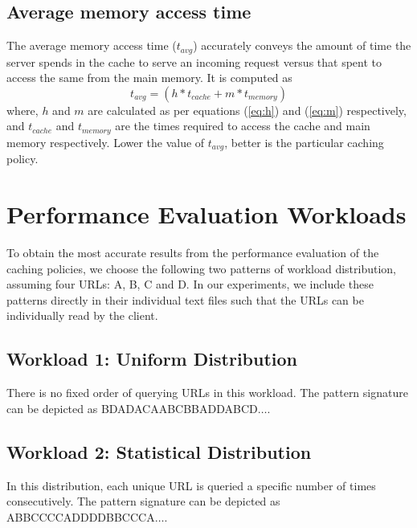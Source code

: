 \documentclass[11pt,pdftex,twocolumn]{article}
\begin{document}
\subsection{Average memory access time}
The average memory access time ($t_{avg}$) accurately conveys the amount of time the server spends in the cache to serve an incoming request versus that spent to access the same from the main memory. It is computed as
\begin{equation}
t_{avg} = \left(h * t_{cache} + m * t_{memory}\right)
\end{equation}
where,
$h$ and $m$ are calculated as per equations (\ref{eq:h}) and (\ref{eq:m}) respectively, and $t_{cache}$ and $t_{memory}$ are the times required to access the cache and main memory respectively. Lower the value of $t_{avg}$, better is the particular caching policy.

\section{Performance Evaluation Workloads}
\label{sec:perfWork}
To obtain the most accurate results from the performance evaluation of the caching policies, we choose the following two patterns of workload distribution, assuming four URLs: A, B, C and D. In our experiments, we include these patterns directly in their individual text files such that the URLs can be individually read by the client. 
\subsection{Workload 1: Uniform Distribution}
There is no fixed order of querying URLs in this workload. The pattern signature can be depicted as BDADACAABCBBADDABCD$\ldots$.
\subsection{Workload 2: Statistical Distribution}
In this distribution, each unique URL is queried a specific number of times consecutively. The pattern signature can be depicted as ABBCCCCADDDDBBCCCA$\ldots$.
\end{document}
